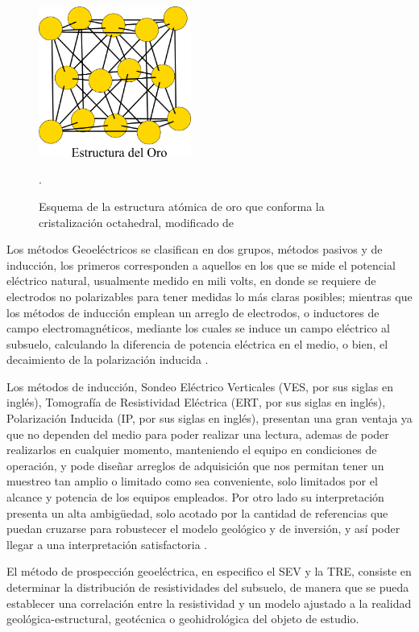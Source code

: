 			\begin{figure}[h!]
				\centering
				\includegraphics[width=5cm]{Imagenes/estructura-oro}
				\caption[Estructura atómica del oro]{Esquema de la estructura atómica de oro que conforma la cristalización octahedral, modificado de \citet{sorrell1973}}.
				\label{fig:eo}
			\end{figure}
			
			Los métodos Geoeléctricos se clasifican en dos grupos, métodos pasivos y de inducción, los primeros corresponden a aquellos en los que se mide el potencial eléctrico natural, usualmente medido en mili volts, en donde se requiere de electrodos no polarizables para tener medidas lo más claras posibles; mientras que los métodos de inducción emplean un arreglo de electrodos, o inductores de campo electromagnéticos, mediante los cuales se induce un campo eléctrico al subsuelo, calculando la diferencia de potencia eléctrica en el medio, o bien, el decaimiento de la polarización inducida \citep{revil2013, reynolds2011, igboama2023}.
			
			Los métodos de inducción, Sondeo Eléctrico Verticales (VES, por sus siglas en inglés), Tomografía de Resistividad Eléctrica (ERT, por sus siglas en inglés), Polarización Inducida (IP, por sus siglas en inglés), presentan una gran ventaja ya que no dependen del medio para poder realizar una lectura, ademas de poder realizarlos en cualquier momento, manteniendo el equipo en condiciones de operación, y pode diseñar arreglos de adquisición que nos permitan tener un muestreo tan amplio o limitado como sea conveniente, solo limitados por el alcance y potencia de los equipos empleados. Por otro lado su interpretación presenta un alta ambigüedad, solo acotado por la cantidad de referencias que puedan cruzarse para robustecer el modelo geológico y de inversión, y así poder llegar a una interpretación satisfactoria \citep{reynolds2011, igboama2023}.
			
			El método de prospección geoeléctrica, en especifico el SEV y la TRE, consiste en determinar la distribución de resistividades del subsuelo, de manera que se pueda establecer una correlación entre la resistividad y un modelo ajustado a la realidad geológica-estructural, geotécnica o geohidrológica del objeto de estudio.
	
